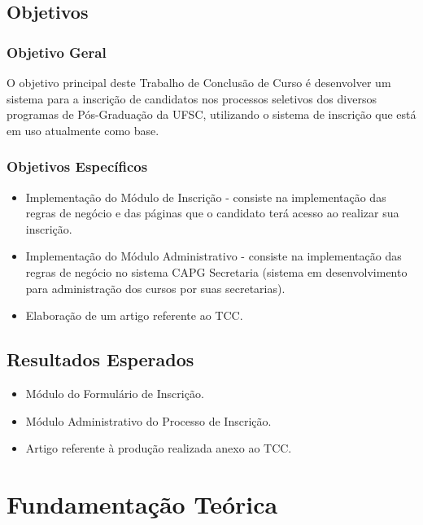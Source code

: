 \documentclass[
  10.5pt,				  %
	openright,			%
	twoside,			  %
  a5paper,
  chapter=TITLE,	%
	section=TITLE,	%
  hyphens,        %
	english,        %
	brazil          %
]{abntex2}
\begin{document}
\section{Objetivos}

\subsection{Objetivo Geral}
O objetivo principal deste Trabalho de Conclusão de Curso é desenvolver um sistema para a inscrição de candidatos nos processos seletivos dos diversos programas de Pós-Graduação da UFSC, utilizando o sistema de inscrição que está em uso atualmente como base.

\subsection{Objetivos Específicos}
\begin{itemize}
  \item Implementação do Módulo de Inscrição - consiste na implementação das regras de negócio e das páginas que o candidato terá acesso ao realizar sua inscrição.
  \item Implementação do Módulo Administrativo - consiste na implementação das regras de negócio no sistema CAPG Secretaria (sistema em desenvolvimento para administração dos cursos por suas secretarias).
  \item Elaboração de um artigo referente ao TCC.
\end{itemize}

\section{Resultados Esperados}
\begin{itemize}
  \item Módulo do Formulário de Inscrição.
  \item Módulo Administrativo do Processo de Inscrição.
  \item Artigo referente à produção realizada anexo ao TCC.
\end{itemize}



\chapter{Fundamentação Teórica}

\end{document}

